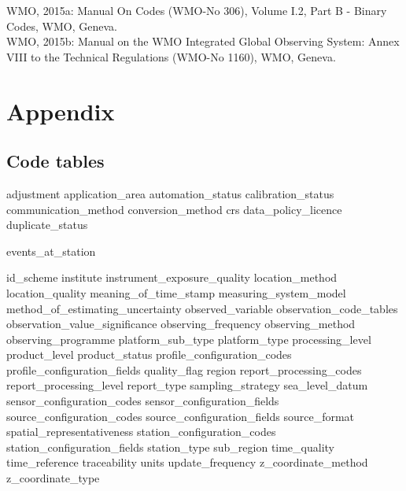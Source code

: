 \documentclass[a4paper]{article}
\begin{document}
\noindent WMO, 2015a: Manual On Codes (WMO-No 306), Volume I.2, Part B - Binary Codes, WMO, Geneva.\\
\noindent WMO, 2015b:  Manual on the WMO Integrated Global Observing System: Annex VIII to the Technical Regulations (WMO-No 1160), WMO, Geneva.


\section {Appendix}

\subsection {Code tables}

 {adjustment}
 {application_area}
 {automation_status}
 {calibration_status}
 {communication_method}
 {conversion_method}
 {crs}
 {data_policy_licence}
 {duplicate_status}

 {events_at_station}

 {id_scheme}
 {institute}
 {instrument_exposure_quality}
 {location_method}
 {location_quality}
 {meaning_of_time_stamp}
 {measuring_system_model}
 {method_of_estimating_uncertainty}
 {observed_variable}
 {observation_code_tables}
 {observation_value_significance}
 {observing_frequency}
 {observing_method}
 {observing_programme}
 {platform_sub_type}
 {platform_type}
 {processing_level}
 {product_level}
 {product_status}
 {profile_configuration_codes}
 {profile_configuration_fields}
 {quality_flag}
 {region}
 {report_processing_codes}
 {report_processing_level}
 {report_type}
 {sampling_strategy}
 {sea_level_datum}
 {sensor_configuration_codes}
 {sensor_configuration_fields}
 {source_configuration_codes}
 {source_configuration_fields}
 {source_format}
 {spatial_representativeness}
 {station_configuration_codes}
 {station_configuration_fields}
 {station_type}
 {sub_region}
 {time_quality}
 {time_reference}
 {traceability}
 {units}
 {update_frequency}
 {z_coordinate_method}
 {z_coordinate_type}

\end{document}
